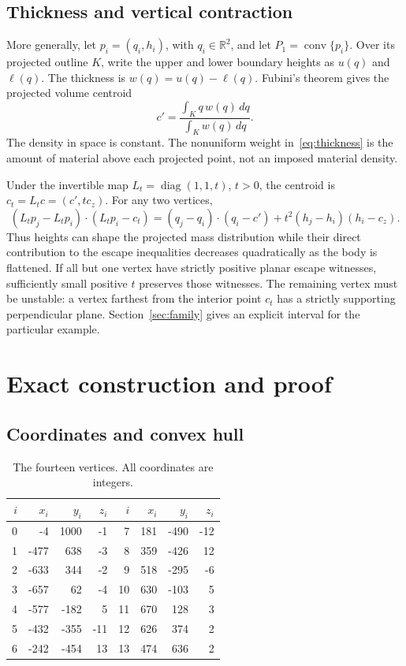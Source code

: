 \documentclass[11pt]{amsart}
\theoremstyle{remark}
\newcommand{\R}{\mathbb R}
\newcommand{\conv}{\operatorname{conv}}
\begin{document}
\subsection{Thickness and vertical contraction}
More generally, let $p_i=(q_i,h_i)$, with $q_i\in\R^2$, and let $P_1=\conv\{p_i\}$. Over its projected outline $K$, write the upper and lower boundary heights as $u(q)$ and $\ell(q)$. The thickness is
$w(q)=u(q)-\ell(q)$. Fubini's theorem gives the projected volume centroid
\begin{equation}\label{eq:thickness}
 c'=\frac{\int_K q\,w(q)\,dq}{\int_K w(q)\,dq}.
\end{equation}
The density in space is constant. The nonuniform weight in~\eqref{eq:thickness} is the amount of material above each projected point, not an imposed material density.

Under the invertible map $L_t=\operatorname{diag}(1,1,t)$, $t>0$, the centroid is $c_t=L_tc=(c',tc_z)$. For any two vertices,
\begin{equation}\label{eq:flatten}
 (L_tp_j-L_tp_i)\cdot(L_tp_i-c_t)
 =(q_j-q_i)\cdot(q_i-c')+t^2(h_j-h_i)(h_i-c_z).
\end{equation}
Thus heights can shape the projected mass distribution while their direct contribution to the escape inequalities decreases quadratically as the body is flattened. If all but one vertex have strictly positive planar escape witnesses, sufficiently small positive $t$ preserves those witnesses. The remaining vertex must be unstable: a vertex farthest from the interior point $c_t$ has a strictly supporting perpendicular plane. Section~\ref{sec:family} gives an explicit interval for the particular example.

\section{Exact construction and proof}\label{sec:proof}

\subsection{Coordinates and convex hull}
\begin{table}[ht]
\centering
\caption{The fourteen vertices. All coordinates are integers.}\label{tab:points}
\begin{tabular}{rrrr@{\qquad}rrrr}
\toprule
$i$ & $x_i$ & $y_i$ & $z_i$ & $i$ & $x_i$ & $y_i$ & $z_i$\\
\midrule
0 & -4 & 1000 & -1 & 7 & 181 & -490 & -12\\
1 & -477 & 638 & -3 & 8 & 359 & -426 & 12\\
2 & -633 & 344 & -2 & 9 & 518 & -295 & -6\\
3 & -657 & 62 & -4 & 10 & 630 & -103 & 5\\
4 & -577 & -182 & 5 & 11 & 670 & 128 & 3\\
5 & -432 & -355 & -11 & 12 & 626 & 374 & 2\\
6 & -242 & -454 & 13 & 13 & 474 & 636 & 2\\
\bottomrule
\end{tabular}
\end{table}
\end{document}
